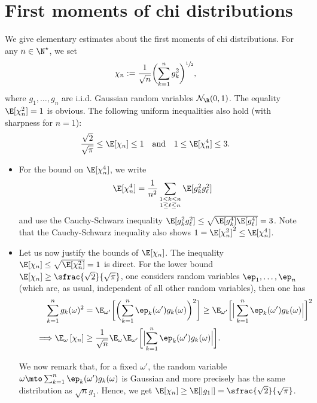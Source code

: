 \appendix
\section{First moments of chi distributions}\label{chi2}

We give elementary estimates about the first moments of chi distributions.
For any $n\in \N^\star$, we set
\begin{equation*}
\chi_n:=\frac{1}{\sqrt{n}}\biggl(\sum_{k=1}^n g_{k}^2\biggr)^{\sfrac{1}{2}},
\end{equation*}
where $g_1,\dots,g_n$ are i.i.d. Gaussian random variables $\mathcal{N}_\R(0,1)$.
The equality $\E[\chi_n^2]=1$ is obvious. The following uniform inequalities also hold (with sharpness for $n=1$):
\begin{equation*}
\frac{\sqrt{2}}{\sqrt{\pi}} \leq \E[\chi_n]\leq 1 \quad\text{and} \quad 1\leq \E[\chi_n^4]\leq 3.
\end{equation*}

\begin{itemize}
\item
For the bound on $\E[\chi_n^4]$, we write
\[
\E[\chi_n^4]= \frac{1}{n^2} \sum_{\substack{1\leq k \leq n\\
1\leq \ell \leq n }} \E[g_{k}^2 g_{\ell}^2]
\]
and use the Cauchy-Schwarz inequality $\E[g_{k}^2 g_{\ell}^2] \leq \sqrt{\E[g_{k}^4]
\E[g_{\ell}^4]}=3 $. Note that the Cauchy-Schwarz inequality also shows $1=\E[\chi_n^2]^2\leq \E[\chi_n^4]$.

\item
Let us now justify the bounds of $\E[\chi_n]$. The inequality \hbox{$\E[\chi_n]\leq \sqrt{\E[\chi_n^2]}=1$} is direct. For the lower bound $\E[\chi_n]\geq \sfrac{\sqrt{2}}{\sqrt{\pi}}$, one considers 	 random variables $\ep_1,\dots,\ep_{n}$
(which are, as usual, independent of all other random variables), then one has
\begin{align*}
\sum_{k=1}^n g_k(\omega)^2 & = \E_{\omega'}\biggl[\biggl(\sum_{k=1}^n \ep_k(\omega')g_{k}(\omega)\biggr)^2 \biggr] \geq \E_{\omega'}\biggl[\Big|\sum_{k=1}^n \ep_k(\omega')g_{k}(\omega)\Big| \biggr]^2\\
\tag*{$\implies$} \E_{\omega}\left[\chi_n\right] & \geq \frac{1}{\sqrt{n}}\E_{\omega}\E_{\omega'}\biggl[\Bigl| \sum_{k=1}^n \ep_k(\omega') g_{k}(\omega)\Bigr|\biggr].
\end{align*}

We now remark that, for a fixed $\omega'$, the random variable $\omega\mto \sum_{k=1}^n \ep_k(\omega') g_{k}(\omega)$ is Gaussian and more precisely has the same distribution as $\sqrt{n}g_1$. Hence, we get
$\E[\chi_n] \geq \E[|g_1|]=\sfrac{\sqrt{2}}{\sqrt{\pi}}$.
\end{itemize}

